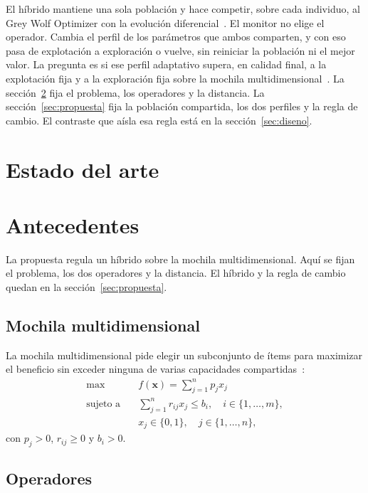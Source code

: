 \documentclass[runningheads]{llncs}
\begin{document}
El híbrido mantiene una sola población y hace competir, sobre cada individuo, al Grey Wolf Optimizer con la evolución diferencial~\cite{storn1997differential}. El monitor no elige el operador. Cambia el perfil de los parámetros que ambos comparten, y con eso pasa de explotación a exploración o vuelve, sin reiniciar la población ni el mejor valor. La pregunta es si ese perfil adaptativo supera, en calidad final, a la explotación fija y a la exploración fija sobre la mochila multidimensional~\cite{chu1998genetic}. La sección~\ref{sec:antecedentes} fija el problema, los operadores y la distancia. La sección~\ref{sec:propuesta} fija la población compartida, los dos perfiles y la regla de cambio. El contraste que aísla esa regla está en la sección~\ref{sec:diseno}.

\section{Estado del arte}

\section{Antecedentes}
\label{sec:antecedentes}

La propuesta regula un híbrido sobre la mochila multidimensional. Aquí se fijan el problema, los dos operadores y la distancia. El híbrido y la regla de cambio quedan en la sección~\ref{sec:propuesta}.

\subsection{Mochila multidimensional}
\label{sec:mochila}

La mochila multidimensional pide elegir un subconjunto de ítems para maximizar el beneficio sin exceder ninguna de varias capacidades compartidas~\cite{chu1998genetic}:
\begin{align}
\max \quad & f(\mathbf{x}) = \sum_{j=1}^{n} p_j x_j \label{eq:mkp} \\
\text{sujeto a} \quad & \sum_{j=1}^{n} r_{ij} x_j \le b_i, \quad i \in \{1, \ldots, m\}, \nonumber \\
& x_j \in \{0,1\}, \quad j \in \{1, \ldots, n\}, \nonumber
\end{align}
con $p_j > 0$, $r_{ij} \ge 0$ y $b_i > 0$.

\subsection{Operadores}
\label{sec:operadores}
\end{document}
